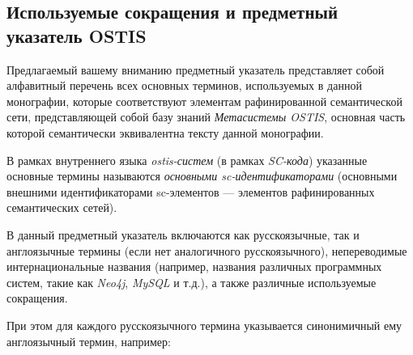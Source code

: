 \begin{partbacktext}
\part*{Используемые сокращения и предметный указатель OSTIS}
\label{part_glossary}

Предлагаемый вашему вниманию предметный указатель представляет собой алфавитный перечень всех основных терминов, используемых в данной монографии, которые  соответствуют элементам рафинированной семантической сети, представляющей собой базу знаний \textit{Метасистемы OSTIS}, основная часть которой семантически эквивалентна тексту данной монографии.

В рамках внутреннего языка \textit{ostis-систем} (в рамках \textit{SC-кода}) указанные основные термины называются \textit{основными sc-идентификаторами} (основными внешними идентификаторами sc-элементов --- элементов рафинированных семантических сетей).

В данный предметный указатель включаются как русскоязычные, так и англоязычные термины (если нет аналогичного русскоязычного), непереводимые интернациональные названия (например, названия различных программных систем, такие как \textit{Neo4j}, \textit{MySQL} и т.д.), а также различные используемые сокращения.

При этом для каждого  русскоязычного термина указывается синонимичный ему  англоязычный термин, например:

\begin{SCn}



\end{SCn}
\end{partbacktext}
